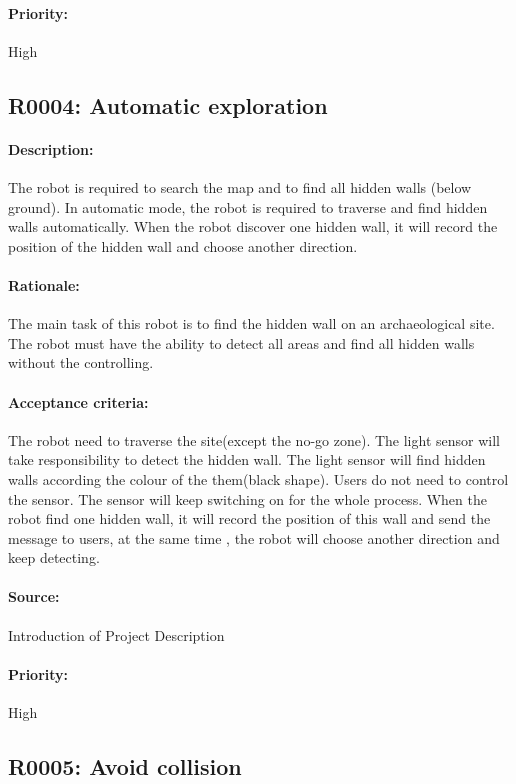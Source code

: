 \documentclass[11pt, a4paper]{report}
\begin{document}
\paragraph{Priority:}
High



\subsection{R0004: Automatic exploration}
\paragraph{Description:}
The robot is required to search the map and to find all hidden walls (below ground). In automatic mode, the robot is required to traverse and find hidden walls automatically. When the robot discover one hidden wall, it will record the position of the hidden wall and choose another direction.
\paragraph{Rationale:}
The main task of this robot is to find the hidden wall on an archaeological site. The robot must have the ability to detect all areas and find all hidden walls without the controlling.   
\paragraph{Acceptance criteria:}
The robot need to traverse the site(except the no-go zone). The light sensor will take responsibility to detect the hidden wall. The light sensor will find hidden walls according the colour of the them(black shape). Users do not need to control the sensor. The sensor will keep switching on for the whole process. When the robot find one hidden wall, it will record the position of this wall and send the message to users, at the same time , the robot will choose another direction and keep detecting.  
\paragraph{Source:}
 Introduction of Project Description
\paragraph{Priority:}
High



\subsection{R0005: Avoid collision}
\end{document}
